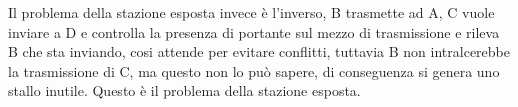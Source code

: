 Il problema della stazione esposta invece è l’inverso, B trasmette ad A, C vuole inviare a D e controlla la presenza di portante sul mezzo di trasmissione e rileva B che sta inviando, cosi attende per evitare conflitti, tuttavia B non intralcerebbe la trasmissione di C, ma questo non lo può sapere, di conseguenza si genera uno stallo inutile. Questo è il problema della stazione esposta.
 